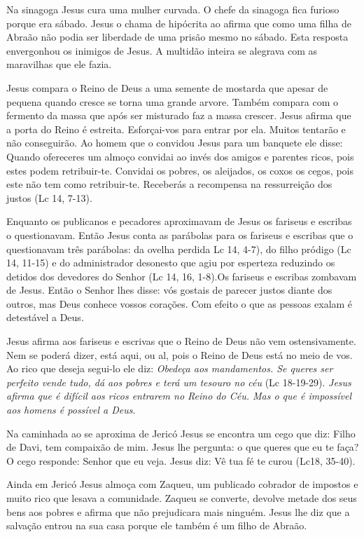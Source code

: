 \documentclass[
]{book}
\begin{document}
Na sinagoga Jesus cura uma mulher curvada. O chefe da sinagoga fica furioso porque era sábado. Jesus o chama de hipócrita ao afirma que como uma filha de Abraão não podia ser liberdade de uma prisão mesmo no sábado. Esta resposta envergonhou os inimigos de Jesus. A multidão inteira se alegrava com as maravilhas que ele fazia.

Jesus compara o Reino de Deus a uma semente de mostarda que apesar de pequena quando cresce se torna uma grande arvore. Também compara com o fermento da massa que após ser misturado faz a massa crescer. Jesus afirma que a porta do Reino é estreita. Esforçai-vos para entrar por ela. Muitos tentarão e não conseguirão. Ao homem que o convidou Jesus para um banquete ele disse: Quando ofereceres um almoço convidai ao invés dos amigos e parentes ricos, pois estes podem retribuir-te. Convidai os pobres, os aleijados, os coxos os cegos, pois este não tem como retribuir-te. Receberás a recompensa na ressurreição dos justos (Lc 14, 7-13).

Enquanto os publicanos e pecadores aproximavam de Jesus os fariseus e escribas o questionavam. Então Jesus conta as parábolas para os fariseus e escribas que o questionavam três parábolas: da ovelha perdida Lc 14, 4-7), do filho pródigo (Lc 14, 11-15) e do administrador desonesto que agiu por esperteza reduzindo os detidos dos devedores do Senhor (Lc 14, 16, 1-8).Os fariseus e escribas zombavam de Jesus. Então o Senhor lhes disse: vós gostais de parecer justos diante dos outros, mas Deus conhece vossos corações. Com efeito o que as pessoas exalam é detestável a Deus.

Jesus afirma aos fariseus e escrivas que o Reino de Deus não vem ostensivamente. Nem se poderá dizer, está aqui, ou al, pois o Reino de Deus está no meio de vos. Ao rico que deseja segui-lo ele diz: \emph{Obedeça aos mandamentos. Se queres ser perfeito vende tudo, dá aos pobres e terá um tesouro no céu} (Lc 18-19-29). \emph{Jesus afirma que é difícil aos ricos entrarem no Reino do Céu. Mas o que é impossível aos homens é possível a Deus}.

Na caminhada ao se aproxima de Jericó Jesus se encontra um cego que diz: Filho de Davi, tem compaixão de mim. Jesus lhe pergunta: o que queres que eu te faça? O cego responde: Senhor que eu veja. Jesus diz: Vê tua fé te curou (Lc18, 35-40).

Ainda em Jericó Jesus almoça com Zaqueu, um publicado cobrador de impostos e muito rico que lesava a comunidade. Zaqueu se converte, devolve metade dos seus bens aos pobres e afirma que não prejudicara mais ninguém. Jesus lhe diz que a salvação entrou na sua casa porque ele também é um filho de Abraão.
\end{document}
